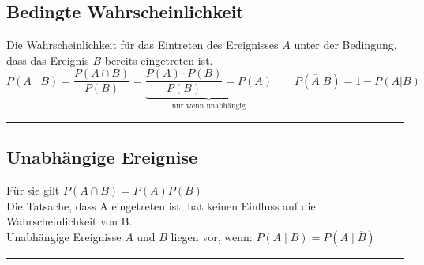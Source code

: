 \subsection{Bedingte Wahrscheinlichkeit }
Die Wahrscheinlichkeit für das Eintreten des Ereignisses $A$ unter der
Bedingung, dass das Ereignis $B$ bereits eingetreten ist.
\[\boxed{P(A\mid B)= \dfrac{P(A\cap B)}{P(B)}}=\underbrace{\frac{P(A)\cdot
  P(B)}{P(B)}=P(A)}_{\text{nur wenn unabhängig}} \qquad P(\overline{A}|B) = 1 -
  P(A|B)\]
  
\hrule

\subsection{Unabhängige Ereignise }
		Für sie gilt \hspace*{5mm} $\boxed{P(A\cap B)=P(A)P(B)}$\\
    	Die Tatsache, dass A eingetreten ist, hat keinen Einfluss auf die 
		Wahrscheinlichkeit von B.\\
		Unabhängige Ereignisse $A$ und $B$ liegen vor, wenn: 
		\hspace*{5mm} $P(A\mid B)=P(A\mid \overline{B})$ \\		
\hrule

